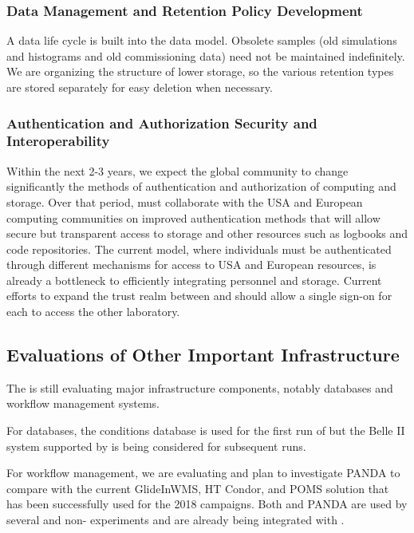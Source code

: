 \subsubsection{Data Management and Retention Policy Development}



A data life cycle is built into the  data model.  Obsolete samples (old simulations and histograms and old commissioning data) need not be maintained indefinitely.  
We are organizing the structure of lower storage, so the various retention types are stored separately for easy deletion when necessary.  

\subsubsection{Authentication and Authorization Security and Interoperability}\label{ch-comp-auth}

Within the next 2-3 years, we expect the global  community to change significantly the methods of authentication and authorization of computing and storage. 
Over that period,  must collaborate with the USA and European  computing communities on improved authentication methods  that will allow secure but transparent access to storage and other resources such as logbooks and code repositories.  The current model, where individuals must be authenticated through different mechanisms for access to USA and European resources, is already a bottleneck to efficiently integrating personnel and storage. 
Current efforts to expand the trust realm between  and  should allow a single sign-on for each to access the other laboratory.


\subsection{Evaluations of Other Important Infrastructure}

The   is still evaluating major infrastructure components, notably databases and workflow management systems.

For databases\cite{Laycock:2019ynk}, the  conditions database is used for the first run of  but the Belle II\cite{Ritter:2018jxh} system supported by  is being considered for subsequent runs. 

For workflow management, we are evaluating \cite{Falabella:2016waj} and plan to investigate PANDA\cite{Megino:2017ywl} to compare with the current GlideInWMS, HT Condor, and POMS solution that has been successfully used for the 2018  campaigns.
Both  and PANDA are used by several  and non- experiments and are already being integrated with . 
